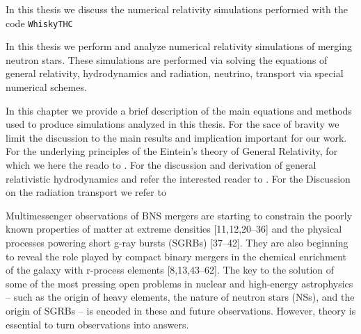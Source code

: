 In this thesis we discuss the numerical relativity simulations performed with the code \texttt{WhiskyTHC}



In this thesis we perform and analyze numerical relativity simulations of merging neutron stars. 
These simulations are performed via solving the equations of general relativity, hydrodynamics and radiation, neutrino, transport via special numerical schemes. 

In this chapter we provide a brief description of the main equations and methods used to produce simulations analyzed in this thesis. 
For the sace of bravity we limit the discussion to the main results and implication important for our work.
For the underlying principles of the Eintein's theory of General Relativity, for which we here the reado to \red{[GR refs]}.
For the discussion and derivation of general relativistic hydrodynamics and refer the interested reader to .
For the Discussion on the radiation transport we refer to 

Multimessenger observations of BNS mergers are starting to constrain the poorly known properties of
matter at extreme densities [11,12,20–36] and the physical processes powering short g-ray bursts (SGRBs)
[37–42]. They are also beginning to reveal the role played by compact binary mergers in the chemical
enrichment of the galaxy with r-process elements [8,13,43–62]. The key to the solution of some of the most
pressing open problems in nuclear and high-energy astrophysics – such as the origin of heavy elements,
the nature of neutron stars (NSs), and the origin of SGRBs – is encoded in these and future observations.
However, theory is essential to turn observations into answers.
